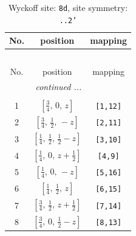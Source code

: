 \documentclass[fleqn,8pt]{jsarticle}
\begin{document}
\begin{longtable}{ccc}
\caption{Wyckoff site: {\tt 8d}, site symmetry: {\tt ..2'}}
 \\
 \hline \hline
No. & position & mapping \\ \hline \endfirsthead

\multicolumn{2}{l}{\tablename\ \thetable{}} \\
 \hline \hline
No. & position & mapping \\ \hline \endhead

 \hline \hline
\multicolumn{2}{r}{\footnotesize\it continued ...} \\ \endfoot

 \hline \hline
\multicolumn{2}{r}{} \\ \endlastfoot

1 & $\left[ \frac{3}{4},\, 0,\, z \right]$ & {\tt [1,12]} \\ \hline
2 & $\left[ \frac{3}{4},\, \frac{1}{2},\, - z \right]$ & {\tt [2,11]} \\ \hline
3 & $\left[ \frac{1}{4},\, \frac{1}{2},\, \frac{1}{2} - z \right]$ & {\tt [3,10]} \\ \hline
4 & $\left[ \frac{1}{4},\, 0,\, z + \frac{1}{2} \right]$ & {\tt [4,9]} \\ \hline
5 & $\left[ \frac{1}{4},\, 0,\, - z \right]$ & {\tt [5,16]} \\ \hline
6 & $\left[ \frac{1}{4},\, \frac{1}{2},\, z \right]$ & {\tt [6,15]} \\ \hline
7 & $\left[ \frac{3}{4},\, \frac{1}{2},\, z + \frac{1}{2} \right]$ & {\tt [7,14]} \\ \hline
8 & $\left[ \frac{3}{4},\, 0,\, \frac{1}{2} - z \right]$ & {\tt [8,13]} \\
\end{longtable}
\renewcommand{\arraystretch}{1.2}
\end{document}
